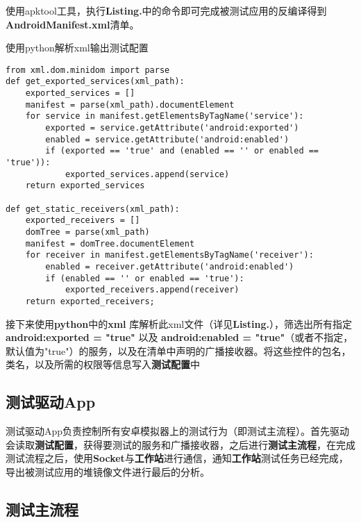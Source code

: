 使用apktool工具\cite{apktool}，执行\textbf{Listing.}\redbf{\ref{shell:apktool}}中的命令即可完成被测试应用的反编译得到\textbf{AndroidManifest.xml}清单。

\begin{listing}[htbp]
	\centering
	\caption{使用python解析xml输出测试配置}
	\begin{verbatim}
from xml.dom.minidom import parse
def get_exported_services(xml_path):
	exported_services = []
	manifest = parse(xml_path).documentElement 
	for service in manifest.getElementsByTagName('service'):
		exported = service.getAttribute('android:exported')
		enabled = service.getAttribute('android:enabled')
		if (exported == 'true' and (enabled == '' or enabled == 'true')):
			exported_services.append(service)
	return exported_services
	
def get_static_receivers(xml_path):
	exported_receivers = []
	domTree = parse(xml_path)
	manifest = domTree.documentElement
	for receiver in manifest.getElementsByTagName('receiver'):
		enabled = receiver.getAttribute('android:enabled')
		if (enabled == '' or enabled == 'true'):
			exported_receivers.append(receiver)
	return exported_receivers;
	\end{verbatim}
	\label{python:get services}	
\end{listing}

接下来使用\textbf{python}中的\textbf{xml} 库解析此xml文件（详见\textbf{Listing.}\redbf{\ref{python:get services}}），筛选出所有指定\textbf{android:exported = "true"} 以及 \textbf{android:enabled = "true"}（或者不指定，默认值为"true"）的服务，以及在清单中声明的广播接收器。将这些控件的包名，类名，以及所需的权限等信息写入\textbf{测试配置}中
\subsection{测试驱动App}\label{test driver app}
测试驱动App负责控制所有安卓模拟器上的测试行为（即测试主流程\redbf{\ref{main flow}}）。首先驱动会读取\textbf{测试配置}，获得要测试的服务和广播接收器，之后进行\textbf{测试主流程}，在完成测试流程之后，使用\textbf{Socket}与\textbf{工作站}进行通信，通知\textbf{工作站}测试任务已经完成，导出被测试应用的堆镜像文件进行最后的分析。
\subsection{测试主流程}\label{main flow}

